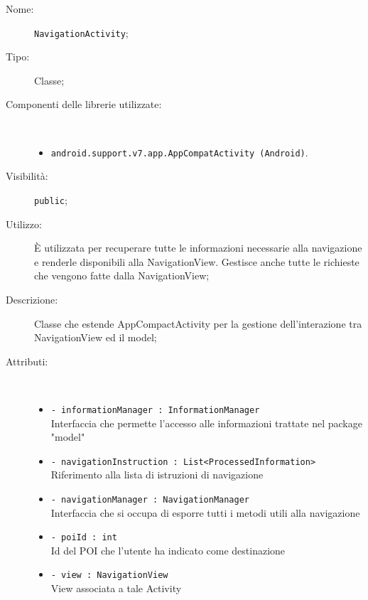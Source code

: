 \documentclass[../DefinizioneDiProdotto.tex]{subfiles}
\begin{document}
\begin{description}
	\item[Nome:] \texttt{NavigationActivity};
	\item[Tipo:] Classe;
	\item[Componenti delle librerie utilizzate:] \
	\begin{itemize}
		\item \texttt{android.support.v7.app.AppCompatActivity (Android)}.
		
	\end{itemize}
	\item[Visibilità:] \texttt{public};
	\item[Utilizzo:] È utilizzata per recuperare tutte le informazioni necessarie alla navigazione e renderle disponibili alla NavigationView. Gestisce anche tutte le richieste che vengono fatte dalla NavigationView;
	\item[Descrizione:] Classe che estende AppCompactActivity per la gestione dell'interazione tra NavigationView ed il model;
	\item[Attributi:] \
	\begin{itemize}
		\item \texttt{- informationManager : InformationManager}\\
		Interfaccia che permette l'accesso alle informazioni trattate nel package "model"
		
		\item \texttt{- navigationInstruction : List<ProcessedInformation>}\\
		Riferimento alla lista di istruzioni di navigazione
		
		\item \texttt{- navigationManager : NavigationManager}\\
		Interfaccia che si occupa di esporre tutti i metodi utili alla navigazione
		
		\item \texttt{- poiId : int}\\
		Id del POI che l'utente ha indicato come destinazione
		
		\item \texttt{- view : NavigationView}\\
		View associata a tale Activity
		

\end{itemize}
\end{description}
\end{document}
